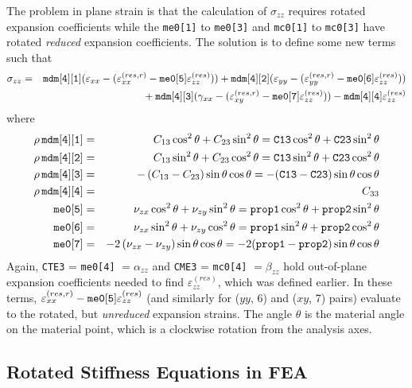 \documentclass[11pt]{article}
\def\a#1{\alpha_{#1}}
\def\b#1{\beta_{#1}}
\def\code#1{{\small\tt #1}}
\def\e#1{\varepsilon_{#1}}
\def\er#1{\varepsilon_{#1}^{(res)}}
\def\err#1{\varepsilon_{#1}^{(res,r)}}
\def\g#1{\gamma_{#1}}
\def\s#1{\sigma_{#1}}
\def\v#1{\nu_{#1}}
\begin{document}
The problem in plane strain is that the calculation of $\s{zz}$ requires rotated expansion coefficients while the \code{me0[1]} to \code{me0[3]}  and \code{mc0[1]} to \code{mc0[3]} have rotated {\em reduced\/} expansion coefficients. The solution is to define some new terms such that
\begin{eqnarray}
     \s{zz} & = & \code{mdm[4][1]} (\e{xx} -(\err{xx}-\code{me0[5]}\er{zz}))
                         +  \code{mdm[4][2]}(\e{yy} -(\err{yy}-\code{me0[6]}\er{zz})) 
     \nonumber \\
     && \qquad\qquad\mbox{}
                 + \code{mdm[4][3]}(\g{xx}-(\err{xy}-\code{me0[7]}\er{zz}))  - \code{mdm[4][4]} \er{zz}
\end{eqnarray}
where
\begin{eqnarray}
 \rho\thinspace \code{mdm[4][1]} & = &C_{13}\cos^2\theta + C_{23}\sin^2\theta
            = \code{C13}\cos^2\theta + \code{C23}\sin^2\theta  \\
 \rho\thinspace \code{mdm[4][2]} & = &C_{13}\sin^2\theta + C_{23}\cos^2\theta
             = \code{C13}\sin^2\theta + \code{C23}\cos^2\theta  \\
 \rho\thinspace \code{mdm[4][3]} & = & - \left(C_{13} - C_{23}\right)\sin\theta\cos\theta
             =  -(\code{C13}-\code{C23})\sin\theta\cos\theta \\
 \rho\thinspace \code{mdm[4][4]} & = & C_{33}  \\
  \code{me0[5]} & = &\v{zx}\cos^2\theta + \v{zy}\sin^2\theta
         = \code{prop1}\cos^2\theta + \code{prop2}\sin^2\theta  \\
  \code{me0[6]} & = &\v{zx}\sin^2\theta + \v{zy}\cos^2\theta
        = \code{prop1}\sin^2\theta + \code{prop2}\cos^2\theta  \\
  \code{me0[7]} & = & - 2\left(\v{zx} - \v{zy}\right)\sin\theta\cos\theta 
       =  -2(\code{prop1}-\code{prop2})\sin\theta\cos\theta
\end{eqnarray}
Again, \code{CTE3} = \code{me0[4]} $=\a{zz}$ and \code{CME3} = \code{mc0[4]} $=\b{zz}$ hold out-of-plane expansion coefficients needed to find $\er{zz}$, which was defined earlier.
In these terms, $\err{xx}-\code{me0[5]}\er{zz}$ (and similarly for ($yy$, 6) and ($xy$, 7) pairs) evaluate to the rotated, but {\em unreduced\/} expansion strains. The angle $\theta$ is the material angle on the material point, which is a clockwise rotation from the analysis axes.

\subsection{Rotated Stiffness Equations in FEA}
\end{document}

